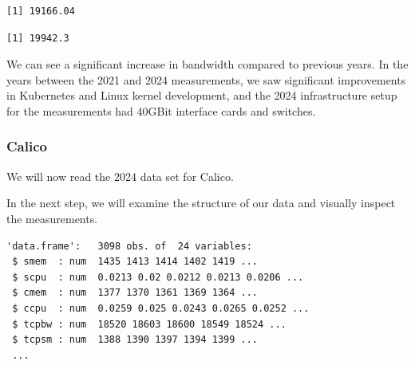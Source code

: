 \begin{verbatim}
[1] 19166.04
\end{verbatim}

\begin{Shaded}
\begin{Highlighting}[]
\SpecialCharTok{\$}
\end{Highlighting}
\end{Shaded}

\begin{verbatim}
[1] 19942.3
\end{verbatim}

We can see a significant increase in bandwidth compared to previous years. In the years between the 2021 and 2024 measurements, we saw significant improvements in Kubernetes and Linux kernel development, and the 2024 infrastructure setup for the measurements had 40GBit interface cards and switches.

\subsubsection{Calico}

We will now read the 2024 data set for Calico.

\begin{Shaded}
\begin{Highlighting}[]
\OtherTok{\textless{}{-}} 
\OtherTok{\textless{}{-}} \NormalTok{(}\NormalTok{,}\NormalTok{))}
\end{Highlighting}
\end{Shaded}

In the next step, we will examine the structure of our data and visually
inspect the measurements.

\begin{Shaded}
\begin{Highlighting}[]
\end{Highlighting}
\end{Shaded}

\begin{verbatim}
'data.frame':   3098 obs. of  24 variables:
 $ smem  : num  1435 1413 1414 1402 1419 ...
 $ scpu  : num  0.0213 0.02 0.0212 0.0213 0.0206 ...
 $ cmem  : num  1377 1370 1361 1369 1364 ...
 $ ccpu  : num  0.0259 0.025 0.0243 0.0265 0.0252 ...
 $ tcpbw : num  18520 18603 18600 18549 18524 ...
 $ tcpsm : num  1388 1390 1397 1394 1399 ...
 ...
\end{verbatim}

